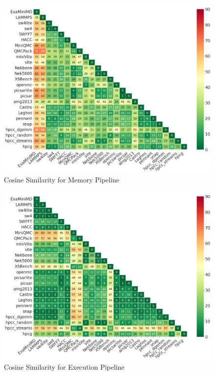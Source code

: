\documentclass[conference]{IEEEtran}
\begin{document}
\begin{figure}[ht]
\centering
\includegraphics[width=0.9\linewidth]{figs/Memory_Pipeline.png}
\caption{Cosine Similarity for Memory Pipeline }
\label{figs:cosine Memory_Pipeline}
\end{figure}

\begin{figure}[ht]
\centering
\includegraphics[width=0.9\linewidth]{figs/Execution_Pipeline.png}
\caption{Cosine Similarity for Execution Pipeline }
\label{figs:cosine Execution_Pipeline}
\end{figure}
\end{document}
